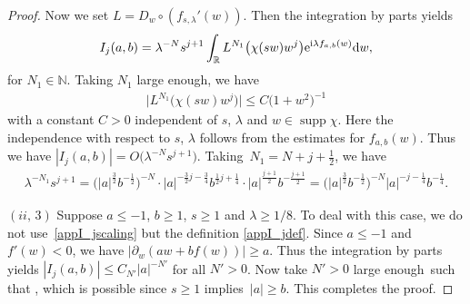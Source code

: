\documentclass[10pt,a4paper]{amsart}
\numberwithin{equation}{section}
\def\R{\mathbb{R}}%
\DeclareMathOperator{\supp}{supp}%
\def\l{\lambda}
\def\pa{\partial}
\begin{document}
\begin{proof}
Now we set $L=D_w\circ(f_{s,\l}'(w))$. Then the integration by parts yields
\begin{align*}
I_j(a,b)= \l^{-N}s^{j+1}\int_{\R}L^{N_1}\bigl(\chi(sw)w^j\bigr){\rm e}^{{\rm i}\l f_{a,b}(w)}{\rm d}w,
\end{align*}
for $N_1\in\mathbb{N}$. Taking $N_1$ large enough, we have
\begin{align*}
\big|L^{N_1}\bigl(\chi(sw)w^j\bigr)\big|\leq C\bigl(1+w^2\bigr)^{-1}
\end{align*}
with a constant $C>0$ independent of $s$, $\l$ and $w\in \supp \chi$. Here the independence with respect to $s$, $\l$ follows from the estimates for $f_{a,b}(w)$. Thus we have $|I_j(a,b)|=O\bigl(\l^{-N}s^{j+1}\bigr)$.
Taking~${N_1=N+j+\frac{1}{2}}$, we have
\begin{align*}
\l^{-N_1}s^{j+1}=\bigl(|a|^{\frac{3}{2}}b^{-\frac{1}{2}}\bigr)^{-N}\cdot |a|^{-\frac{3}{2}j-\frac{3}{4}}b^{\frac{1}{2}j+\frac{1}{4}} \cdot |a|^{\frac{j+1}{2}}b^{-\frac{j+1}{2}}=\bigl(|a|^{\frac{3}{2}}b^{-\frac{1}{2}}\bigr)^{-N}|a|^{-j-\frac{1}{4}}b^{-\frac{1}{4}}.
\end{align*}

 $(ii,\,3)$ Suppose $a\leq -1$, $b\geq 1$, $s\geq 1$ and $\l\geq 1/8$. To deal with this case, we do not use~\eqref{appI_jscaling} but the definition \eqref{appI_jdef}. Since $a\leq -1$ and $f'(w)<0$, we have $|\pa_w(aw+bf(w))|\geq a$. Thus the integration by parts yields $|I_j(a,b)|\leq C_{N'}|a|^{-N'}$ for all $N'>0$. Now take $N'>0$ large enough~such that , which is possible since $s\geq 1$ implies~${|a|\geq b}$. This completes the proof.
\end{proof}
\end{document}
